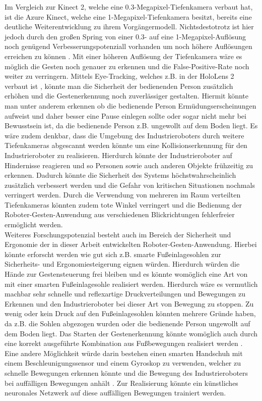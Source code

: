 Im Vergleich zur Kinect 2, welche eine \num{0,3}-Megapixel-Tiefenkamera verbaut hat, ist die Azure Kinect, welche eine 1-Megapixel-Tiefenkamera besitzt, bereits eine deutliche Weiterentwicklung zu ihrem Vorgängermodell. Nichtsdestotrotz ist hier jedoch durch den großen Spring von einer \num{0,3}- auf eine 1-Megapixel-Auflösung noch genügend Verbesserungspotenziall vorhanden um noch höhere Auflösungen erreichen zu können \cite{bamji__2018}. Mit einer höheren Auflösung der Tiefenkamera wäre es möglich die Gesten noch genauer zu erkennen und die False-Positive-Rate noch weiter zu verringern. Mittels Eye-Tracking, welches z.B. in der HoloLens 2 verbaut ist \cite{hololens2_hardware_nodate}, könnte man die Sicherheit der bedienenden Person zusätzlich erhöhen und die Gestenerkennung noch zuverlässiger gestalten. Hiermit könnte man unter anderem erkennen ob die bedienende Person Ermüdungserscheinungen aufweist und daher besser eine Pause einlegen sollte oder sogar nicht mehr bei Bewusstsein ist, da die bedienende Person z.B. ungewollt auf dem Boden liegt. Es wäre zudem denkbar, dass die Umgebung des Industrieroboters durch weitere Tiefenkameras abgescannt werden könnte um eine Kollisionserkennung für den Industrieroboter zu realisieren. Hierdurch könnte der Industrieroboter auf Hindernisse reagieren und so Personen sowie auch anderen Objekte frühzeitig zu erkennen. Dadurch könnte die Sicherheit des Systems höchstwahrscheinlich zusätzlich verbessert werden und die Gefahr von kritischen Situationen nochmals verringert werden. Durch die Verwendung von mehreren im Raum verteilten Tiefenkameras könnten zudem tote Winkel verringert und die Bedienung der Roboter-Gesten-Anwendung aus verschiedenen Blickrichtungen fehlerfreier ermöglicht werden.\\

Weiteres Forschungspotenzial besteht auch im Bereich der Sicherheit und Ergonomie der in dieser Arbeit entwickelten Roboter-Gesten-Anwendung. Hierbei könnte erforscht werden wie gut sich z.B. smarte Fußeinlagesohlen zur Sicherheits- und Ergonomiesteigerung eignen würden. Hierdurch würden die Hände zur Gestensteuerung frei bleiben und es könnte womöglich eine Art von  mit einer smarten Fußeinlagesohle realisiert werden. Hierdurch wäre es vermutlich machbar sehr schnelle und reflexartige Druckverteilungen und Bewegungen zu Erkennen und den Industrieroboter bei dieser Art von Bewegung zu stoppen. Zu wenig oder kein Druck auf den Fußeinlagesohlen könnten mehrere Gründe haben, da z.B. die Sohlen abgezogen wurden oder die bedienende Person ungewollt auf dem Boden liegt. Das Starten der Gestenerkennung könnte womöglich auch durch eine korrekt ausgeführte Kombination aus Fußbewegungen realisiert werden \cite{tan_design_2015}. Eine andere Möglichkeit würde darin bestehen einen smarten Handschuh mit einem Beschleunigungssensor und einem Gyroskop zu verwenden, welcher zu schnelle Bewegungen erkennen könnte und die Bewegung des Industrieroboters bei auffälligen Bewegungen anhält \cite{ghimire_smart_2019}. Zur Realisierung könnte ein künstliches neuronales Netzwerk auf diese auffälligen Bewegungen trainiert werden.
